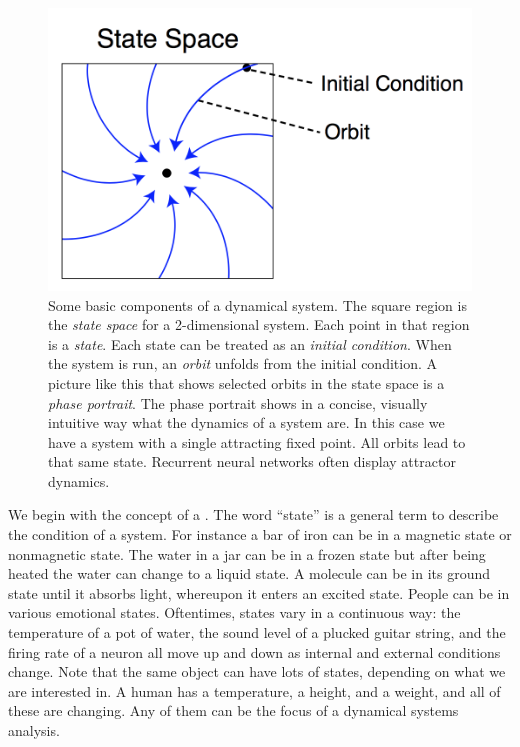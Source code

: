 \begin{figure}[h]
\centering
\includegraphics[scale=.45]{./images/StateSpaceParts.png}
\caption[Pamela Payne.]{Some basic components of a dynamical system. The square region is the \emph{state space} for a 2-dimensional system. Each point in that region is a \emph{state}. Each state can be treated as an \emph{initial condition}. When the system is run, an \emph{orbit} unfolds from the initial condition. A picture like this that shows selected orbits in the state space is a \emph{phase portrait}. The phase portrait shows in a concise, visually intuitive way what the dynamics of a system are. In this case we have a system with a single attracting fixed point. All orbits lead to that same state. Recurrent neural networks often display attractor dynamics.}
\label{F:stateSpaceParts}
\end{figure}

 We begin with the concept of a . The word ``state'' is a general term to describe the condition of a system. For instance a bar of iron can be in a magnetic state or nonmagnetic
state. The water in a jar can be in a frozen state but after being heated the 
water can change to a liquid state. A molecule can be in its ground state 
until it absorbs light, whereupon it enters an excited state. People can be in
various emotional states. Oftentimes, states vary in a continuous way: the temperature
of a pot of water, the sound level of a plucked guitar string, and the firing rate of a neuron all move up and down as internal and external conditions change. Note that the same object can have lots of states, depending on what we are interested in. A human has a temperature, a height, and a weight, and all of these are changing. Any of them can be the focus of a dynamical systems analysis.

